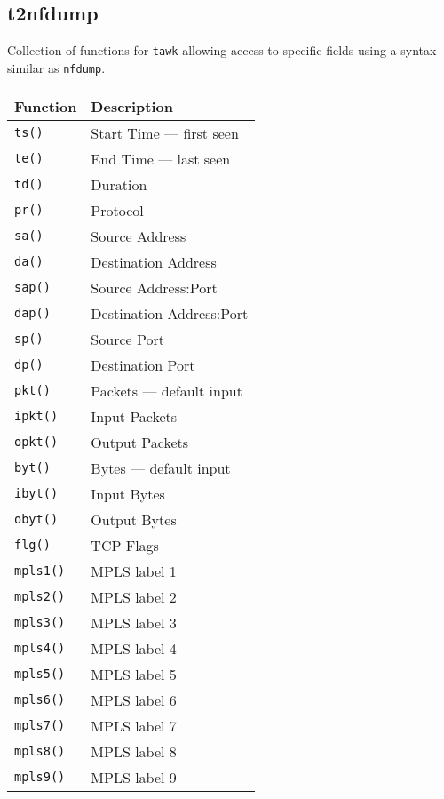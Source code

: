 \documentclass[documentation]{subfiles}
\begin{document}
\subsection{t2nfdump}\label{t2nfdump}
Collection of functions for {\tt tawk} allowing access to specific fields using a syntax similar as {\tt nfdump}.
\begin{longtable}{ll}
    \toprule
    {\bf Function} & {\bf Description}\\
    \midrule\endhead%
    {\tt ts()}        & Start Time --- first seen\\
    {\tt te()}        & End Time --- last seen\\
    {\tt td()}        & Duration\\
    {\tt pr()}        & Protocol\\
    {\tt sa()}        & Source Address\\
    {\tt da()}        & Destination Address\\
    {\tt sap()}       & Source Address:Port\\
    {\tt dap()}       & Destination Address:Port\\
    {\tt sp()}        & Source Port\\
    {\tt dp()}        & Destination Port\\
    {\tt pkt()}       & Packets --- default input\\
    {\tt ipkt()}      & Input Packets\\
    {\tt opkt()}      & Output Packets\\
    {\tt byt()}       & Bytes --- default input\\
    {\tt ibyt()}      & Input Bytes\\
    {\tt obyt()}      & Output Bytes\\
    {\tt flg()}       & TCP Flags\\
    {\tt mpls1()}     & MPLS label 1\\
    {\tt mpls2()}     & MPLS label 2\\
    {\tt mpls3()}     & MPLS label 3\\
    {\tt mpls4()}     & MPLS label 4\\
    {\tt mpls5()}     & MPLS label 5\\
    {\tt mpls6()}     & MPLS label 6\\
    {\tt mpls7()}     & MPLS label 7\\
    {\tt mpls8()}     & MPLS label 8\\
    {\tt mpls9()}     & MPLS label 9\\

\end{longtable}
\end{document}
